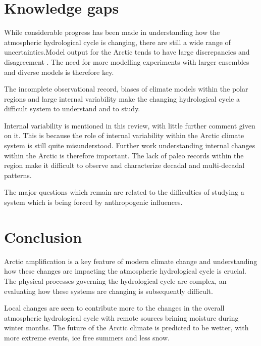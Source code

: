 \documentclass[12pt, oneside]{article}
\begin{document}
\section{Knowledge gaps}\label{gaps}
While considerable progress has been made in understanding how the atmospheric hydrological cycle is changing, there are still a wide range of uncertainties.Model output for the Arctic tends to have large discrepancies and disagreement \cite{vihma2016atmospheric}. The need for more modelling experiments with larger ensembles and diverse models is therefore key.

The incomplete observational record, biases of climate models within the polar regions and large internal variability make the changing hydrological cycle a difficult system to understand and to study. %


Internal variability is mentioned in this review, with little further comment given on it. This is because the role of internal variability within the Arctic climate system is still quite misunderstood. Further work understanding internal changes within the Arctic is therefore important. The lack of paleo records within the region make it difficult to observe and characterize decadal and multi-decadal patterns. 

The major questions which remain are related to the difficulties of studying a system which is being forced by anthropogenic influences. 




\section{Conclusion}

Arctic amplification is a key feature of modern climate change and understanding how these changes are impacting the atmospheric hydrological cycle is crucial. The physical processes governing the hydrological cycle are complex, an evaluating how these systems are changing is subsequently difficult.

Local changes are seen to contribute more to the changes in the overall atmospheric hydrological cycle with remote sources brining moisture during winter months. The future of the Arctic climate is predicted to be wetter, with more extreme events, ice free summers and less snow. 

 {}

\end{document}
